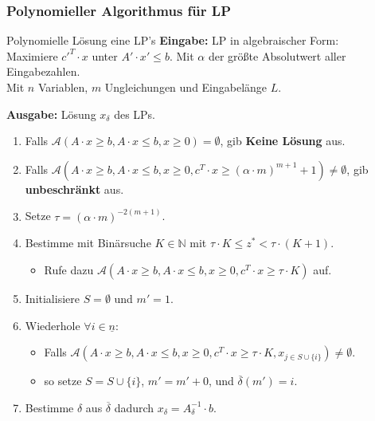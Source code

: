 \documentclass{panikzettel}
\begin{document}
\subsubsection{Polynomieller Algorithmus für LP}

\begin{algo}{Polynomielle Lösung eine LP's}
\textbf{Eingabe:} LP in algebraischer Form: \\
\-\hspace{1em} Maximiere ${c'}^T \cdot x$ unter $A' \cdot x' \leq b$.
Mit $\alpha$ der größte Absolutwert aller Eingabezahlen. \\
Mit $n$ Variablen, $m$ Ungleichungen und Eingabelänge $L$.

\textbf{Ausgabe:} Lösung $x_\delta$ des LPs.
\tcblower
\begin{enumerate}
    \item Falls $\mathcal{A}(A \cdot x \geq b,A \cdot x \leq b, x \geq 0) = \emptyset$, gib \textbf{Keine Lösung} aus.
    \item Falls $\mathcal{A}(A \cdot x \geq b,A \cdot x \leq b, x \geq 0, c^T \cdot x \geq (\alpha \cdot m)^{m+1} +1 ) \neq \emptyset$, gib \textbf{unbeschränkt} aus.
    \item Setze $\tau = (\alpha \cdot m)^{-2(m+1)}$.
    \item Bestimme mit Binärsuche $K \in \mathbb{N}$ mit $\tau \cdot K \leq z^* < \tau \cdot (K+1)$.
    \begin{itemize}
        \item Rufe dazu $\mathcal{A}(A \cdot x \geq b,A \cdot x \leq b, x \geq 0, c^T \cdot x \geq \tau \cdot K)$ auf.
    \end{itemize}
    \item Initialisiere $S = \emptyset$ und $m' = 1$.
    \item Wiederhole $\forall i \in \underline{n}$:
    \begin{itemize}
        \item Falls $\mathcal{A}(A \cdot x \geq b,A \cdot x \leq b, x \geq 0, c^T \cdot x \geq \tau \cdot K, x_{j \in S \cup \{ i \} }) \neq \emptyset$.
        \item so setze $S = S \cup \{ i \}$, $m' = m' +0$, und $\overline{\delta}(m') = i$.
    \end{itemize}
    \item Bestimme $\delta$ aus $\overline{\delta}$ dadurch $x_{\delta} = A_{\delta}^{-1} \cdot b$.
\end{enumerate}
\end{algo}
\end{document}
